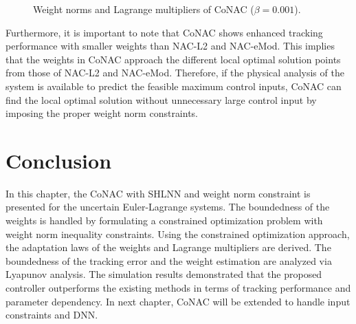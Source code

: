\begin{figure}[!t]      
    \centering
    \vfill
    \caption{Weight norms and Lagrange multipliers of CoNAC ($\beta=0.001$).}
    \label{chap3:fig:weight_multiplier CoNAC}
\end{figure}

Furthermore, it is important to note that CoNAC shows enhanced tracking performance with smaller weights than NAC-L2 and NAC-eMod.
This implies that the weights in CoNAC approach the different local optimal solution points from those of NAC-L2 and NAC-eMod.
Therefore, if the physical analysis of the system is available to predict the feasible maximum control inputs, CoNAC can find the local optimal solution without unnecessary large control input by imposing the proper weight norm constraints.

\section{Conclusion}

In this chapter, the CoNAC with SHLNN and weight norm constraint is presented for the uncertain Euler-Lagrange systems.
The boundedness of the weights is handled by formulating a constrained optimization problem with weight norm inequality constraints.
Using the constrained optimization approach, the adaptation laws of the weights and Lagrange multipliers are derived.
The boundedness of the tracking error and the weight estimation are analyzed via Lyapunov analysis.
The simulation results demonstrated that the proposed controller outperforms the existing methods in terms of tracking performance and parameter dependency.
In next chapter, CoNAC will be extended to handle input constraints and DNN.

